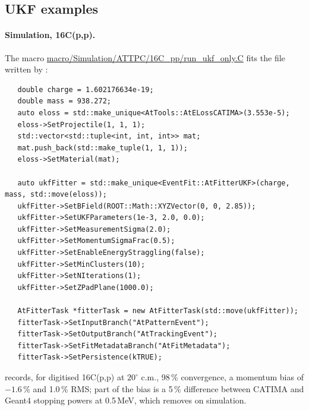 \subsection{UKF examples}

\paragraph{Simulation, 16C(p,p).} The macro \url{macro/Simulation/ATTPC/16C_pp/run_ukf_only.C} fits the file
 written by :
\begingroup\footnotesize
\begin{verbatim}
   double charge = 1.602176634e-19;
   double mass = 938.272;
   auto eloss = std::make_unique<AtTools::AtELossCATIMA>(3.553e-5);
   eloss->SetProjectile(1, 1, 1);
   std::vector<std::tuple<int, int, int>> mat;
   mat.push_back(std::make_tuple(1, 1, 1));
   eloss->SetMaterial(mat);

   auto ukfFitter = std::make_unique<EventFit::AtFitterUKF>(charge, mass, std::move(eloss));
   ukfFitter->SetBField(ROOT::Math::XYZVector(0, 0, 2.85));
   ukfFitter->SetUKFParameters(1e-3, 2.0, 0.0);
   ukfFitter->SetMeasurementSigma(2.0);
   ukfFitter->SetMomentumSigmaFrac(0.5);
   ukfFitter->SetEnableEnergyStraggling(false);
   ukfFitter->SetMinClusters(10);
   ukfFitter->SetNIterations(1);
   ukfFitter->SetZPadPlane(1000.0);

   AtFitterTask *fitterTask = new AtFitterTask(std::move(ukfFitter));
   fitterTask->SetInputBranch("AtPatternEvent");
   fitterTask->SetOutputBranch("AtTrackingEvent");
   fitterTask->SetFitMetadataBranch("AtFitMetadata");
   fitterTask->SetPersistence(kTRUE);
\end{verbatim}
\endgroup
{} records, for digitised 16C(p,p) at $20^\circ$ c.m., 98\,\% convergence, a momentum bias of $-1.6$\,\%
and 1.0\,\% RMS; part of the bias is a 5\,\% difference between CATIMA and Geant4 stopping powers at 0.5\,MeV, which
 removes on simulation.

